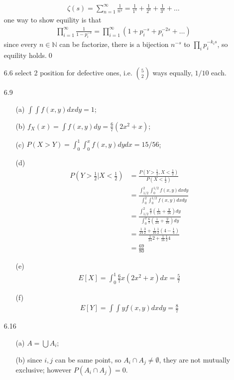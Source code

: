 \documentclass[paper=a4, fontsize=11pt]{scrartcl} %
\numberwithin{equation}{section} %
\numberwithin{figure}{section} %
\numberwithin{table}{section} %
\begin{document}
\begin{itemize}
	\begin{align}
		\zeta(s) = \sum_{n=1}^\infty \frac{1}{n^s} = \frac{1}{1^s} + \frac{1}{2^s} +\frac{1}{3^s} + \dots
	\end{align}
	one way to show equility is that
	\begin{align}
		\prod_{i=1}^\infty \frac{1}{1-p_i^{-s}} = \prod_{i=1}^\infty  (1+p_i^{-s}+p_i^{-2s}+\dots)
	\end{align}
	since every $n\in \mathbb{N}$ can be factorize, there is a bijection $n^{-s}$ to $\prod_i p_i^{-k_is}$, so equility holds.\qed
	\item[6.6] select 2 position for defective ones, i.e. ${5\choose 2}$ ways equally, $1/10$ each.
	\item[6.9]
	\begin{itemize}
		\item[(a)] $\int\int f(x,y)dxdy = 1$;
		\item[(b)] $f_X(x)=\int f(x,y)dy = \frac{6}{7}(2x^2+x)$;
		\item[(c)] $P(X>Y)=\int_0^1 \int_0^x f(x,y)dydx = 15/56$;
		\item[(d)]
		\begin{align}
			P(Y>\frac{1}{2}| X<\frac{1}{2}) &= \frac{P(Y>\frac{1}{2} , X<\frac{1}{2})}{P(X<\frac{1}{2})} \\
				&= \frac{\int_{1/2}^2 \int_0^{1/2}f(x,y)dxdy} {\int_{0}^2 \int_0^{1/2}f(x,y)dxdy}\\
				&= \frac{\int_{1/2}^2 \frac{6}{7}(\frac{1}{24}+\frac{y}{16})dy}{\int_{0}^2 \frac{6}{7}(\frac{1}{24}+\frac{y}{16})dy}\\
				&= \frac{\frac{1}{24}\frac{3}{2}+\frac{1}{16}\frac{1}{2}(4-\frac{1}{4})}{\frac{1}{24}2+\frac{1}{16}\frac{1}{2}4}\\
				&= \frac{69}{80}
		\end{align}
		\item[(e)]
		\begin{align}
			E[X] = \int_0^1 \frac{6}{7}x(2x^2+x)dx = \frac{5}{7}
		\end{align}
		\item[(f)]
		\begin{align}
			E[Y] = \int\int yf(x,y)dxdy = \frac{8}{7}
		\end{align}
	\end{itemize}
	\item[6.16]
	\begin{itemize}
		\item[(a)] $A=\bigcup A_i$;
		\item[(b)] since $i,j$ can be same point, so $A_i\cap A_j\neq \emptyset$, they are not mutually exclusive; however $P(A_i\cap A_j) = 0$.

\end{itemize}
\end{itemize}
\end{document}
